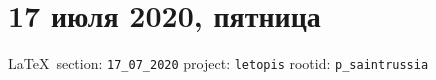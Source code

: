  
 

\section{17 июля 2020, пятница}
\label{sec:17_07_2020}

  
\vspace{0.5cm}
{\ifDEBUG\small\LaTeX~section: \verb|17_07_2020| project: \verb|letopis| rootid: \verb|p_saintrussia|\fi}
\vspace{0.5cm}

  
